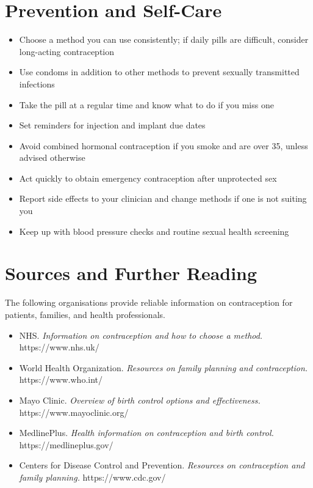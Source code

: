 \section*{Prevention and Self-Care}
\begin{itemize}
    \item Choose a method you can use consistently; if daily pills are difficult, consider long-acting contraception
    \item Use condoms in addition to other methods to prevent sexually transmitted infections
    \item Take the pill at a regular time and know what to do if you miss one
    \item Set reminders for injection and implant due dates
    \item Avoid combined hormonal contraception if you smoke and are over 35, unless advised otherwise
    \item Act quickly to obtain emergency contraception after unprotected sex
    \item Report side effects to your clinician and change methods if one is not suiting you
    \item Keep up with blood pressure checks and routine sexual health screening
\end{itemize}

\section*{Sources and Further Reading}
The following organisations provide reliable information on contraception for patients, families, and health professionals.

\begin{itemize}
    \item NHS. \textit{Information on contraception and how to choose a method.} https://www.nhs.uk/
    \item World Health Organization. \textit{Resources on family planning and contraception.} https://www.who.int/
    \item Mayo Clinic. \textit{Overview of birth control options and effectiveness.} https://www.mayoclinic.org/
    \item MedlinePlus. \textit{Health information on contraception and birth control.} https://medlineplus.gov/
    \item Centers for Disease Control and Prevention. \textit{Resources on contraception and family planning.} https://www.cdc.gov/
\end{itemize}
